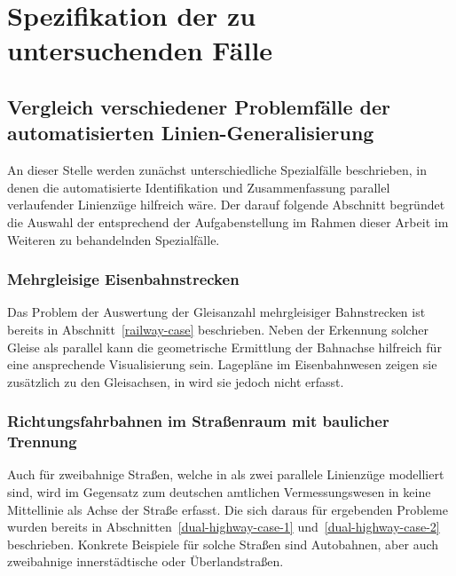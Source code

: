 \documentclass[../main/thesis.tex]{subfiles}
\begin{document}
\chapter{Spezifikation der zu untersuchenden Fälle}



\section{Vergleich verschiedener Problemfälle der automatisierten Linien-Generalisierung}
\label{ch:case-comparison}


An dieser Stelle werden zunächst unterschiedliche Spezialfälle beschrieben, in denen die automatisierte Identifikation und Zusammenfassung parallel verlaufender Linienzüge hilfreich wäre.
Der darauf folgende Abschnitt begründet die Auswahl der entsprechend der Aufgabenstellung im Rahmen dieser Arbeit im Weiteren zu behandelnden Spezialfälle.


\subsection{Mehrgleisige Eisenbahnstrecken}

Das Problem der Auswertung der Gleisanzahl mehrgleisiger Bahnstrecken ist bereits in Abschnitt~\ref{railway-case} beschrieben.
Neben der Erkennung solcher Gleise als parallel kann die geometrische Ermittlung der Bahnachse hilfreich für eine ansprechende Visualisierung sein.
Lagepläne im Eisenbahnwesen zeigen sie zusätzlich zu den Gleisachsen, in \osm{} wird sie jedoch nicht erfasst.



\subsection{Richtungsfahrbahnen im Straßenraum mit baulicher Trennung}
\label{ch:dual-highway-case-desc}

Auch für zweibahnige Straßen, welche in \osm{} als zwei parallele Linienzüge modelliert sind, wird im Gegensatz zum deutschen amtlichen Vermessungswesen  in \osm{} keine Mittellinie als Achse der Straße erfasst.
Die sich daraus für \osm{} ergebenden Probleme wurden bereits in Abschnitten~\ref{dual-highway-case-1} und~\ref{dual-highway-case-2} beschrieben.
Konkrete Beispiele für solche Straßen sind Autobahnen, aber auch zweibahnige innerstädtische oder Überlandstraßen.
\end{document}
